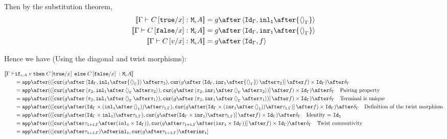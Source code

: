 {    Then by the substitution theorem,
    \begin{align}
        \deno{\typerelation{\G}{C\ssub{x}{\t}}{\mea}} & = g\after\pr{\idg}{\inl_\1\after{\term{\G}}}\\
        \deno{\typerelation{\G}{C\ssub{x}{\f}}{\mea}} & = g\after\pr{\idg}{\inr_\1\after{\term{\G}}}\\
        \deno{\gtyperelation{C\ssub{x}{v}}{\mea}} & = g\after\pr{\idg}{f}
    \end{align}

    Hence we have (Using the diagonal and twist morphisms):
 
    \begin{align}
        \deno{\gtyperelation{&\ifthenelse{\e}{A}{v}{C\ssub{x}{\t}}{C\ssub{x}{\f}}}{\mea}}  \\ 
        & = \ifMorph{f}{g\after\pr{\idg}{\inl_\1\after{\term{\G}}}}{g\after\pr{\idg}{\inr_\1\after{\term{\G}}}}\\
        & = \app\after((\fld{
            \cur{g\after\pr{\pp}{\inl_1\after\term{\G}\after\pp}}
        }{
            \cur{g\after\pr{\pp}{\inr_1\after\term{\G}\after\pp}}
        }\after f)\times \idg)\after\diag{\G}\qt{Pairing property}\\
        &= \app\after((\fld{
            \cur{g\after\pr{\pp}{\inl_1\after\term{\G}\after\p}}
        }{
            \cur{g\after\pr{\pp}{\inr_1\after\term{\G}\after\p}}
        }\after f)\times \idg)\after\diag{\G}\qt{Terminal is unique}\\
        &= \app\after((\fld{
            \cur{g\after(\idg\times (\inl_\1\after\term{\1}))\after\twist{\1}{\G}}
        }{
            \cur{g\after(\idg\times (\inr_\1\after\term{\1}))\after\twist{\1}{\G}}
        }\after f)\times \idg)\after\diag{\G}\qt{Definition of the twist morphism}\\
        & = \app\after((\fld{
            \cur{g\after(\idg\times \inl_\1)\after\twist{\1}{\G}}
        }{
            \cur{g\after(\idg\times \inr_\1)\after\twist{\1}{\G}}
        }\after f)\times \idg)\after\diag{\G}\qt{Identity = $\Id{\1}$}\\
        & = \app\after((\fld{
            \cur{g\after\twist{\1+\1}{\G}\after(\inl_\1\times \idg)}
        }{
            \cur{g\after\twist{\1+\1}{\G}\after(\inr_\1\times \idg)}
        }\after f)\times \idg)\after\diag{\G}\qt{Twist commutivity}\\
        & = \app\after((\fld{
            \cur{g\after\twist{\1+\1}{\G}}\after\inl_\1
        }{
            \cur{g\after\twist{\1+\1}{\G}}\after\inr_\1
}
\end{align}}
